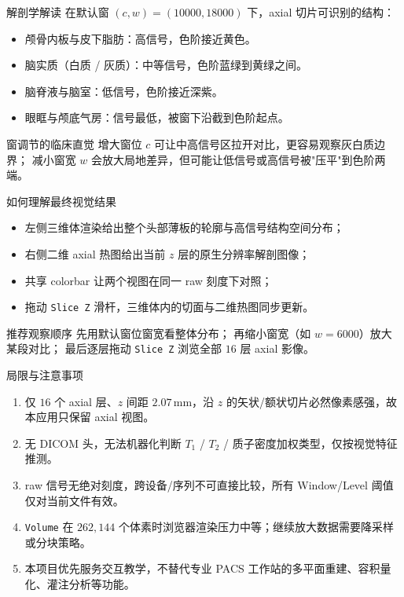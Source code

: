 \documentclass[aspectratio=169,11pt]{ctexbeamer}
\begin{document}
\begin{frame}{解剖学解读}
  \small
  在默认窗 $(c,w)=(10000,18000)$ 下，axial 切片可识别的结构：

  \begin{itemize}
    \item 颅骨内板与皮下脂肪：高信号，色阶接近黄色。
    \item 脑实质（白质 / 灰质）：中等信号，色阶蓝绿到黄绿之间。
    \item 脑脊液与脑室：低信号，色阶接近深紫。
    \item 眼眶与颅底气房：信号最低，被窗下沿截到色阶起点。
  \end{itemize}

  \begin{block}{窗调节的临床直觉}
    增大窗位 $c$ 可让中高信号区拉开对比，更容易观察灰白质边界；
    减小窗宽 $w$ 会放大局地差异，但可能让低信号或高信号被"压平"到色阶两端。
  \end{block}
\end{frame}

\begin{frame}{如何理解最终视觉结果}
  \small
  \begin{itemize}
    \item 左侧三维体渲染给出整个头部薄板的轮廓与高信号结构空间分布；
    \item 右侧二维 axial 热图给出当前 $z$ 层的原生分辨率解剖图像；
    \item 共享 colorbar 让两个视图在同一 raw 刻度下对照；
    \item 拖动 \texttt{Slice Z} 滑杆，三维体内的切面与二维热图同步更新。
  \end{itemize}

  \begin{block}{推荐观察顺序}
    先用默认窗位窗宽看整体分布；
    再缩小窗宽（如 $w=6000$）放大某段对比；
    最后逐层拖动 \texttt{Slice Z} 浏览全部 $16$ 层 axial 影像。
  \end{block}
\end{frame}

\begin{frame}{局限与注意事项}
  \small
  \begin{enumerate}
    \item 仅 $16$ 个 axial 层、$z$ 间距 $2.07\,\mathrm{mm}$，沿 $z$ 的矢状/额状切片必然像素感强，故本应用只保留 axial 视图。
    \item 无 DICOM 头，无法机器化判断 $T_1$ / $T_2$ / 质子密度加权类型，仅按视觉特征推测。
    \item raw 信号无绝对刻度，跨设备/序列不可直接比较，所有 Window/Level 阈值仅对当前文件有效。
    \item \texttt{Volume} 在 $262{,}144$ 个体素时浏览器渲染压力中等；继续放大数据需要降采样或分块策略。
    \item 本项目优先服务交互教学，不替代专业 PACS 工作站的多平面重建、容积量化、灌注分析等功能。
  \end{enumerate}
\end{frame}
\end{document}
